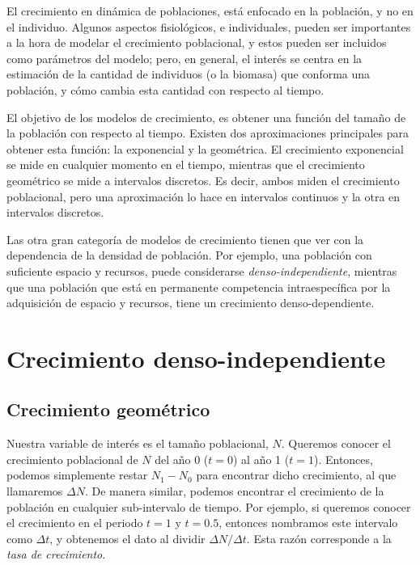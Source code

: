 \documentclass[12pt,letterpaper,]{book}
\begin{document}
El crecimiento en dinámica de poblaciones, está
enfocado en la población, y no en el individuo. Algunos aspectos
fisiológicos, e individuales, pueden ser importantes a la hora de
modelar el crecimiento poblacional, y estos pueden ser incluidos como
parámetros del modelo; pero, en general, el interés se centra en la
estimación de la cantidad de individuos (o la biomasa) que conforma una
población, y cómo cambia esta cantidad con respecto al tiempo.

El objetivo de los modelos de crecimiento, es obtener una función del
tamaño de la población con respecto al tiempo. Existen dos
aproximaciones principales para obtener esta función: la exponencial y
la geométrica. El crecimiento exponencial se mide en cualquier momento
en el tiempo, mientras que el crecimiento geométrico se mide a
intervalos discretos. Es decir, ambos miden el crecimiento poblacional,
pero una aproximación lo hace en intervalos continuos y la otra en
intervalos discretos.

Las otra gran categoría de modelos de crecimiento tienen que ver con la
dependencia de la densidad de población. Por ejemplo, una población con
suficiente espacio y recursos, puede considerarse
\emph{denso-independiente}, mientras que una población que está en
permanente competencia intraespecífica por la adquisición de espacio y
recursos, tiene un crecimiento denso-dependiente.

\section{Crecimiento
denso-independiente}\label{crecimiento-denso-independiente}


\subsection{Crecimiento geométrico}\label{crecimiento-geometrico}


Nuestra variable de interés es el tamaño poblacional, \(N\). Queremos
conocer el crecimiento poblacional de \(N\) del año 0 (\(t=0\)) al año 1
(\(t=1\)). Entonces, podemos simplemente restar \(N_1 - N_0\) para
encontrar dicho crecimiento, al que llamaremos \(\Delta N\). De manera
similar, podemos encontrar el crecimiento de la población en cualquier
sub-intervalo de tiempo. Por ejemplo, si queremos conocer el crecimiento
en el periodo \(t=1\) y \(t=0.5\), entonces nombramos este intervalo
como \(\Delta t\), y obtenemos el dato al dividir
\(\Delta N / \Delta t\). Esta razón corresponde a la \emph{tasa de
crecimiento}.
\end{document}
